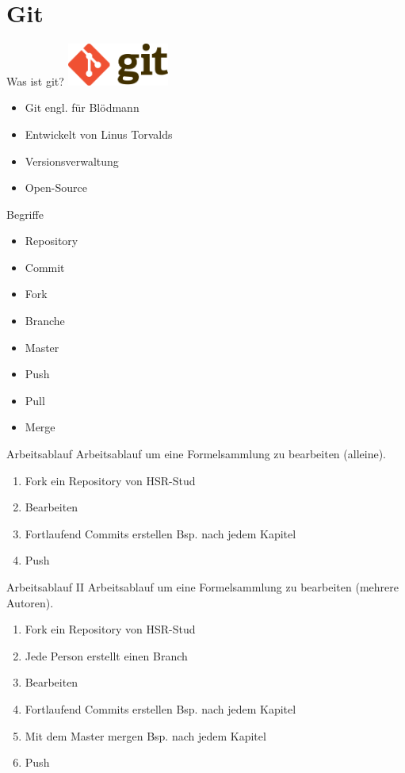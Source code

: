 \section{Git}
\begin{frame}{Was ist git?}
	\includegraphics[width=0.25\textwidth]{pic/git.png}\\
	\begin{itemize}
		\item Git engl. für Blödmann  \pause
		\item Entwickelt von Linus Torvalds \pause
		\item Versionsverwaltung \pause
		\item Open-Source
	\end{itemize}
\end{frame}

\begin{frame}{Begriffe}
	\begin{itemize}
		\item Repository \pause
		\item Commit \pause
		\item Fork \pause
		\item Branche \pause
		\item Master \pause
		\item Push \pause
		\item Pull \pause
		\item Merge		
	\end{itemize}	
\end{frame}

\begin{frame}{Arbeitsablauf}
	Arbeitsablauf um eine Formelsammlung zu bearbeiten (alleine).
	\begin{enumerate}
		\item Fork ein Repository von HSR-Stud \pause
		\item Bearbeiten \pause
		\item Fortlaufend Commits erstellen Bsp. nach jedem Kapitel \pause
		\item Push
	\end{enumerate}
	
\end{frame}

\begin{frame}{Arbeitsablauf II}
Arbeitsablauf um eine Formelsammlung zu bearbeiten (mehrere Autoren).
\begin{enumerate}
	\item Fork ein Repository von HSR-Stud  \pause
	\item Jede Person erstellt einen Branch \pause
	\item Bearbeiten \pause
	\item Fortlaufend Commits erstellen Bsp. nach jedem Kapitel \pause
	\item Mit dem Master mergen Bsp. nach jedem Kapitel \pause
	\item Push
\end{enumerate}

\end{frame}

